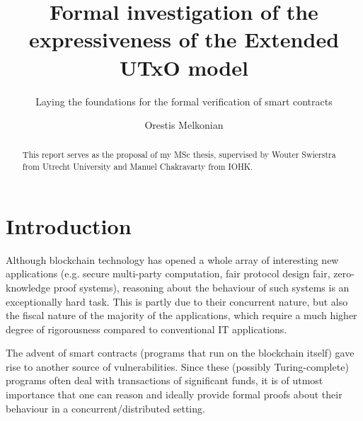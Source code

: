 \documentclass[acmsmall,nonacm=true,screen=true]{acmart}\settopmatter{printfolios=false,printccs=false,printacmref=false}
\begin{document}
\title{Formal investigation of the expressiveness of the Extended UTxO model}
\subtitle{Laying the foundations for the formal verification of smart contracts}

\author{Orestis Melkonian}

\begin{abstract}
This report serves as the proposal of my MSc thesis, supervised by Wouter Swierstra from
Utrecht University and Manuel Chakravarty from IOHK.
\end{abstract}

\maketitle

\section{Introduction}
\label{sec:intro}

Although blockchain technology has opened a whole array of interesting new applications
(e.g. secure multi-party computation\cite{mpc}, fair protocol design fair\cite{fair}, zero-knowledge proof systems\cite{zeroproof}), 
reasoning about the behaviour of such systems is an exceptionally hard task. This is partly due to their concurrent nature, but
also the fiscal nature of the majority of the applications, which require a much higher degree of rigorousness compared to
conventional IT applications.

The advent of smart contracts (programs that run on the blockchain itself) gave
rise to another source of vulnerabilities. Since these (possibly Turing-complete)
programs often deal with transactions of significant funds,
it is of utmost importance that one can reason and ideally provide formal proofs
about their behaviour in a concurrent/distributed setting.
\end{document}
